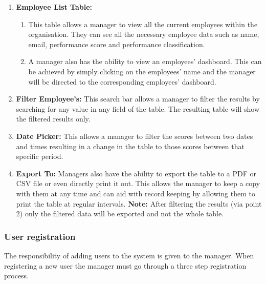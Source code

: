 \documentclass[11pt,a4paper]{article}
\begin{document}
\begin{enumerate}
	\item \textbf{Employee List Table:} 
	\begin{enumerate}
		\item This table allows a manager to view all the current employees within the organisation. They can see all the necessary employee data such as name, email, performance score and performance classification.
		\item A manager also has the ability to view an employees' dashboard. This can be achieved by simply clicking on the employees' name and the manager will be directed to the corresponding employees' dashboard.
	\end{enumerate}
	\item \textbf{Filter Employee's:} This search bar allows a manager to filter the results by searching for any value in any field of the table. The resulting table will show the filtered results only. 
	\item \textbf{Date Picker:} This allows a manager to filter the scores between two dates and times resulting in a change in the table to those scores between that specific period. 
	\item \textbf{Export To:} Managers also have the ability to export the table to a PDF or CSV file or even directly print it out. This allows the manager to keep a copy with them at any time and can aid with record keeping by allowing them to print the table at regular intervals. \textbf{Note:} After filtering the results (via point 2) only the filtered data will be exported and not the whole table. 
\end{enumerate}

\subsubsection{User registration}
The responsibility of adding users to the system is given to the manager. When registering a new user the manager must go through a three step registration process.
\end{document}
